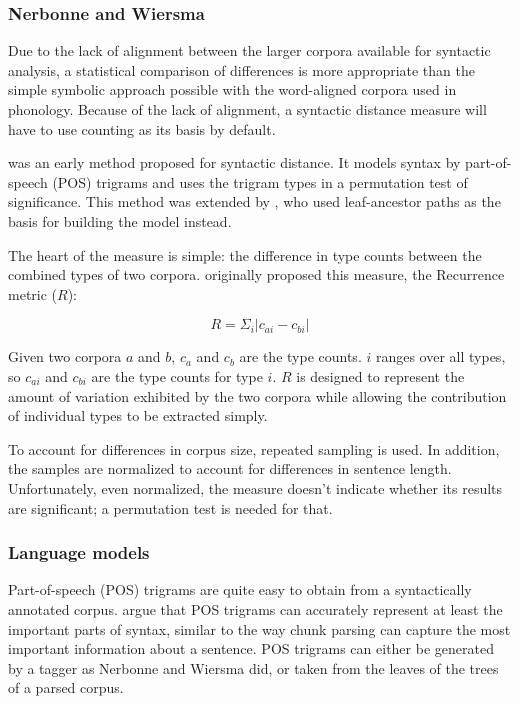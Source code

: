 \documentclass[11pt]{article}
\begin{document}
\subsubsection{Nerbonne and Wiersma}
\label{nerbonne06}

Due to the lack of alignment between the
larger corpora available for syntactic analysis, a statistical
comparison of differences is more appropriate than the simple
symbolic approach possible with the word-aligned corpora used in
phonology. Because of the lack of alignment, a syntactic distance
measure will have to use counting as its basis by default.

 was an early method proposed for syntactic
distance.  It models syntax by part-of-speech (POS) trigrams and uses
the trigram types in a permutation test of significance. This method was
extended by , who used 
leaf-ancestor paths as the basis for building the model instead.

The heart of the measure is simple: the difference in type counts
between the combined types of two corpora. 
originally proposed this measure, the {\sc Recurrence}
metric ($R$):

\begin{equation}
R = \Sigma_i |c_{ai} - c_{bi}|
\label{rmeasure}
\end{equation}

\noindent{}Given two corpora $a$ and $b$, $c_a$ and $c_b$ are the type
counts. $i$ ranges over all types, so $c_{ai}$ and $c_{bi}$ are the
type counts for type $i$.  $R$ is designed to represent the amount of
variation exhibited by the two corpora while allowing the contribution
of individual types to be extracted simply.

To account for differences in corpus size, repeated sampling is
used. In addition, the samples are normalized to account for
differences in sentence length.  Unfortunately, even normalized, the
measure doesn't indicate whether its results are significant; a
permutation test is needed for that.


\subsubsection{Language models}
Part-of-speech (POS) trigrams are quite easy to obtain from a syntactically
annotated corpus.  argue that POS trigrams
can accurately represent at least the important parts of syntax,
similar to the way chunk parsing can capture the most important
information about a sentence. POS trigrams can either be generated by
a tagger as Nerbonne and Wiersma did, or taken from the leaves of
the trees of a parsed corpus.
\end{document}

